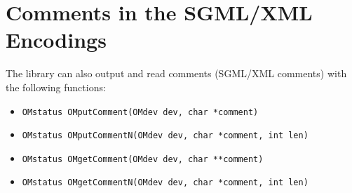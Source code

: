 \documentclass{article}
\newcommand{\OM}{{\sl OpenMath}}
\begin{document}
%
%
%


\section{Comments in the SGML/XML Encodings}

The library can also output and read comments (SGML/XML comments) with the
following functions:
\begin{itemize} 
\item \verb+OMstatus OMputComment(OMdev dev, char *comment)+
\item \verb+OMstatus OMputCommentN(OMdev dev, char *comment, int len)+
\item \verb+OMstatus OMgetComment(OMdev dev, char **comment)+
\item \verb+OMstatus OMgetCommentN(OMdev dev, char *comment, int len)+
\end{itemize} 
\end{document}
